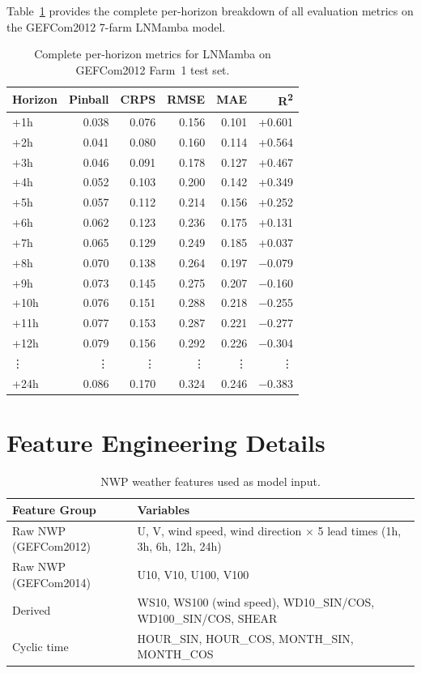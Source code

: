 \documentclass[review]{elsarticle}
\begin{document}
Table~\ref{tab:full_horizon} provides the complete per-horizon breakdown of all evaluation metrics on the GEFCom2012 7-farm LNMamba model.

\begin{table}[H]
\centering
\caption{Complete per-horizon metrics for LNMamba on GEFCom2012 Farm~1 test set.}
\label{tab:full_horizon}
\footnotesize
\begin{tabular}{@{}lrrrrr@{}}
\toprule
\textbf{Horizon} & \textbf{Pinball} & \textbf{CRPS} & \textbf{RMSE} & \textbf{MAE} & \textbf{R\textsuperscript{2}} \\
\midrule
+1h  & 0.038 & 0.076 & 0.156 & 0.101 & +0.601 \\
+2h  & 0.041 & 0.080 & 0.160 & 0.114 & +0.564 \\
+3h  & 0.046 & 0.091 & 0.178 & 0.127 & +0.467 \\
+4h  & 0.052 & 0.103 & 0.200 & 0.142 & +0.349 \\
+5h  & 0.057 & 0.112 & 0.214 & 0.156 & +0.252 \\
+6h  & 0.062 & 0.123 & 0.236 & 0.175 & +0.131 \\
+7h  & 0.065 & 0.129 & 0.249 & 0.185 & +0.037 \\
+8h  & 0.070 & 0.138 & 0.264 & 0.197 & $-$0.079 \\
+9h  & 0.073 & 0.145 & 0.275 & 0.207 & $-$0.160 \\
+10h & 0.076 & 0.151 & 0.288 & 0.218 & $-$0.255 \\
+11h & 0.077 & 0.153 & 0.287 & 0.221 & $-$0.277 \\
+12h & 0.079 & 0.156 & 0.292 & 0.226 & $-$0.304 \\
\vdots & \vdots & \vdots & \vdots & \vdots & \vdots \\
+24h & 0.086 & 0.170 & 0.324 & 0.246 & $-$0.383 \\
\bottomrule
\end{tabular}
\end{table}

\section{Feature Engineering Details}

\begin{table}[H]
\centering
\caption{NWP weather features used as model input.}
\label{tab:features}
\begin{tabular}{@{}ll@{}}
\toprule
\textbf{Feature Group} & \textbf{Variables} \\
\midrule
Raw NWP (GEFCom2012) & U, V, wind speed, wind direction $\times$ 5 lead times (1h, 3h, 6h, 12h, 24h) \\
Raw NWP (GEFCom2014) & U10, V10, U100, V100 \\
Derived & WS10, WS100 (wind speed), WD10\_SIN/COS, WD100\_SIN/COS, SHEAR \\
Cyclic time & HOUR\_SIN, HOUR\_COS, MONTH\_SIN, MONTH\_COS \\
\bottomrule
\end{tabular}
\end{table}
\end{document}
